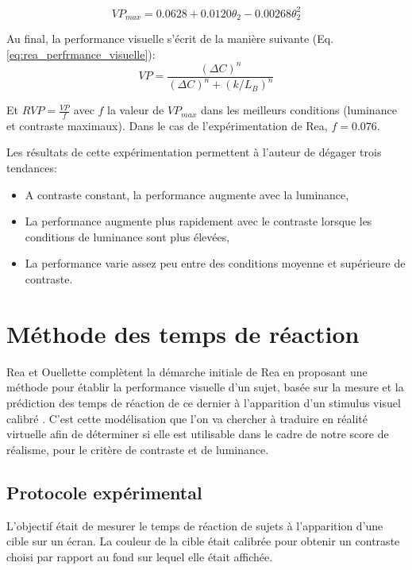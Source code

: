 	\begin{equation}
		VP_{max} = 0.0628 + 0.0120 \theta_2 - 0.00268 \theta_2^2
		\label{eq:rea_vpmax}
	\end{equation}
	
	\par Au final, la performance visuelle s'écrit de la manière suivante (Eq. \ref{eq:rea_perfrmance_visuelle}):
	\begin{equation}
		VP = \frac{(\Delta C)^n}{(\Delta C)^n + (k/L_B)^n}
		\label{eq:rea_perfrmance_visuelle}
	\end{equation}
	
	\par Et $RVP = \frac{VP}{f}$ avec $f$ la valeur de $VP_{max}$ dans les meilleurs conditions (luminance et contraste maximaux). Dans le cas de l'expérimentation de Rea, $f = 0.076$.
	
	\par Les résultats de cette expérimentation permettent à l'auteur de dégager trois tendances:
	\begin{itemize}
		\item A contraste constant, la performance augmente avec la luminance,
		\item La performance augmente plus rapidement avec le contraste lorsque les conditions de luminance sont plus élevées,
		\item La performance varie assez peu entre des conditions moyenne et supérieure de contraste.
	\end{itemize}
	
	\section{Méthode des temps de réaction}
	\par Rea et Ouellette complètent la démarche initiale de Rea en proposant une méthode pour établir la performance visuelle d'un sujet, basée sur la mesure et la prédiction des temps de réaction de ce dernier à l'apparition d'un stimulus visuel calibré \citep{rea_visual_1988, rea_relative_1991}. C'est cette modélisation que l'on va chercher à traduire en réalité virtuelle afin de déterminer si elle est utilisable dans le cadre de notre score de réalisme, pour le critère de contraste et de luminance.
	
	\subsection{Protocole expérimental}
	\par L'objectif était de mesurer le temps de réaction de sujets à l'apparition d'une cible sur un écran. La couleur de la cible était calibrée pour obtenir un contraste choisi par rapport au fond sur lequel elle était affichée.
	

